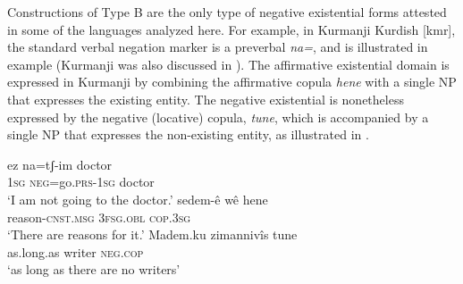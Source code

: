﻿\documentclass[output=paper]{langsci/langscibook}
\begin{document}
Constructions of Type B are the only type of negative existential forms
attested in some of the languages analyzed here. For example, in
Kurmanji Kurdish [kmr], the standard verbal negation marker is
a preverbal \textit{na=}, and is illustrated in example
 (Kurmanji was also discussed in
). The affirmative existential domain is expressed in
Kurmanji by combining the affirmative copula \textit{hene} with a single NP
that expresses the existing entity. The negative existential is nonetheless
expressed by the negative (locative) copula, \textit{tune}, which is
accompanied by a single NP that expresses the non-existing entity, as
illustrated in .
%
\begin{exe}\ex
{}
\begin{xlist}
\ex\label{ex:ieur-kurmanji-doctor}
    \gll ez na=tʃ-im doctor \\
\textsc{1sg}   \textsc{neg}=go.\textsc{prs-1sg}    doctor \\
    \glt `I am not going to the doctor.'
\ex
\gll sedem-ê wê hene\\
reason-\textsc{cnst}.\textsc{msg}   \textsc{3fsg}.\textsc{obl}
\textsc{cop}.\textsc{3sg}\\
\glt `There are reasons for it.'
\ex\label{ex:ieur-kurmanji-nowriters}
\gll Madem.ku zimannivîs tune \\
as.long.as  writer \textsc{neg.cop}\\
\glt `as long as there are no writers'
\end{xlist}\end{exe}
\end{document}
